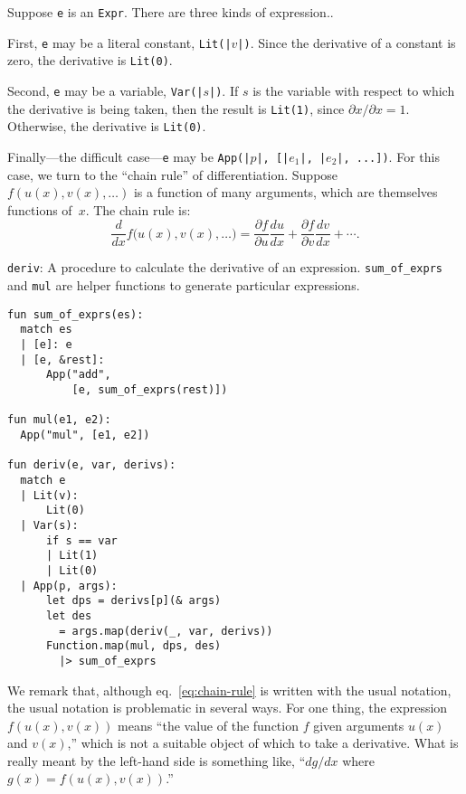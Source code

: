\documentclass[11pt, a4paper]{article}
\newcommand{\cd}[1]{\texttt{#1}}
\begin{document}
Suppose \cd{e} is an \cd{Expr}. There are three kinds of expression..

First, \cd{e} may be a literal constant, \cd{Lit(|$v$|)}. Since the
derivative of a constant is zero, the derivative is \cd{Lit(0)}.

Second, \cd{e} may be a variable, \cd{Var(|$s$|)}. If $s$ is the
variable with respect to which the derivative is being taken, then the
result is \cd{Lit(1)}, since $\partial x/\partial x = 1$. Otherwise, the derivative
is \cd{Lit(0)}.

Finally---the difficult case---\cd{e} may be \cd{App(|$p$|, [|$e_1$|,
  |$e_2$|, ...])}. For this case, we turn to the ``chain rule'' of
differentiation. Suppose $f(u(x), v(x), \dots)$ is a function of many
arguments, which are themselves functions of~$x$. The chain rule is:
\begin{equation}\label{eq:chain-rule}
  \frac{d}{dx}f\bigl(u(x), v(x), \dotsc\bigr) =
  \frac{\partial f}{\partial u} \frac{du}{dx} 
  + \frac{\partial f}{\partial v}\frac{dv}{dx}
  + \dotsb. 
\end{equation}

\begin{marginfigure}
  \caption{\cd{deriv}: A procedure to calculate the derivative of an
    expression. \cd{sum_of_exprs} and \cd{mul} are helper functions to
    generate particular expressions.\label{fig:deriv}}
  \footnotesize%
\begin{verbatim}
fun sum_of_exprs(es):
  match es
  | [e]: e
  | [e, &rest]:
      App("add",
          [e, sum_of_exprs(rest)])

fun mul(e1, e2):
  App("mul", [e1, e2])

fun deriv(e, var, derivs):
  match e
  | Lit(v):
      Lit(0)
  | Var(s):
      if s == var
      | Lit(1)
      | Lit(0)
  | App(p, args):
      let dps = derivs[p](& args)
      let des
        = args.map(deriv(_, var, derivs))
      Function.map(mul, dps, des)
        |> sum_of_exprs 
\end{verbatim}
\end{marginfigure}
We remark that, although eq.~\eqref{eq:chain-rule} is written with the
usual notation, the usual notation is problematic in several ways. For
one thing, the expression $f(u(x), v(x))$ means ``the value of the
function $f$ given arguments $u(x)$ and $v(x)$,'' which is not a
suitable object of which to take a derivative. What is really meant by
the left-hand side is something like, ``$dg/dx$ where
$g(x) = f(u(x),v(x))$.''
\end{document}

